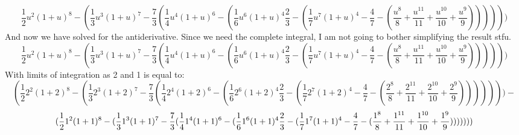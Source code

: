 \documentclass{article}
\begin{document}
$$\frac{1}{2}u^2(1+u)^8-(\frac{1}{3}u^3(1+u)^7-\frac{7}{3}(\frac{1}{4}u^4(1+u)^6-(\frac
{1}{6}u^6(1+u)^4\frac{2}{3}-(\frac{1}{7}u^7(1+u)^4-\frac{4}{7}-(\frac{u^8}{8}+\frac{u^{11}}{11}+\frac{u^{10}}{10}+\frac{u^9}{ 9}))))))$$
And now we have solved for the antiderivative. Since we need the complete integral, I am not going to bother simplifying the result stfu.
$$\frac{1}{2}u^2(1+u)^8-(\frac{1}{3}u^3(1+u)^7-\frac{7}{3}(\frac{1}{4}u^4(1+u)^6-(\frac{1}{6}u^6(1+u)^4\frac{2}{3}-(\frac{1}{7}u^7(1+u)^4-\frac{4}{7}-(\frac{u^8}{8}+\frac{u^{11}}{11}+\frac{u^{10}}{10}+\frac{u^9}{ 9}))))))$$ With limits of integration as 2 and 1 is equal to:
$$(\frac{1}{2}2^2(1+2)^8-(\frac{1}{3}2^3(1+2)^7-\frac{7}{3}(\frac{1}{4}2^4(1+2)^6-(\frac{1}{6}2^6(1+2)^4\frac{2}{3}-(\frac{1}{7}2^7(1+2)^4-\frac{4}{7}-(\frac{2^8}{8}+\frac{2^{11}}{11}+\frac{2^{10}}{10}+\frac{2^9}{ 9})))))))-$$$$(\frac{1}{2}1^2(1+1)^8-(\frac{1}{3}1^3(1+1)^7-\frac{7}{3}(\frac{1}{4}1^4(1+1)^6-(\frac{1}{6}1^6(1+1)^4\frac{2}{3}\\-(\frac{1}{7}1^7(1+1)^4-\frac{4}{7}-(\frac{1^8}{8}+\frac{1^{11}}{11}+\frac{1^{10}}{10}+\frac{1^9}{ 9})))))))$$
\end{document}
